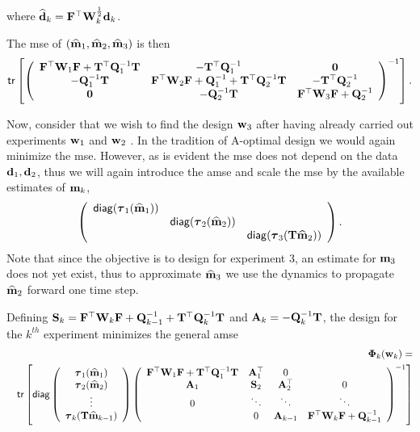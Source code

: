 \documentclass[11pt]{article}
\newcommand{\bfA}	{{\bf{A}}}
\newcommand{\bfF}	{{\bf{F}}}
\newcommand{\bfQ}	{{\bf{Q}}}
\newcommand{\bfS}	{{\bf{S}}}
\newcommand{\bfT}	{{\bf{T}}}
\newcommand{\bfW}	{{\bf{W}}}
\newcommand{\bfd}	{{\bf{d}}}
\newcommand{\bfm}	{{\bf{m}}}
\newcommand{\bfw}	{{\bf{w}}}
\newcommand{\hf}        {{\frac 12}}
\newcommand{\bfPhi}     {{\boldsymbol \Phi}}
\newcommand{\bftau}      {{\boldsymbol \tau}}
\newcommand {\zero}  { {\bf 0} }
\renewcommand{\hf}		 {\frac12}
\newcommand{\bfmhat}    {{\widehat{\bfm}}}
\newcommand{\bfdhat}    {{\widehat{\bfd}}}
\begin{document}
where $\bfdhat_k = \bfF^{\top}\bfW_k^{\hf}\bfd_k$. 

The {\sf mse} of $(\bfmhat_1,\bfmhat_2, \bfmhat_3)$ is then
\begin{equation*}
 {\sf tr}\left[\left(\begin{array}{ccc}\bfF^{\top}\bfW_1\bfF + \bfT^{\top}\bfQ^{-1}_1\bfT   & -\bfT^{\top}\bfQ^{-1}_1 & \zero\\
 -\bfQ^{-1}_1\bfT & \bfF^{\top}\bfW_2\bfF + \bfQ^{-1}_1 + \bfT^{\top}\bfQ^{-1}_2\bfT  & -\bfT^{\top}\bfQ^{-1}_2\\
 \zero & -\bfQ^{-1}_2\bfT & \bfF^{\top}\bfW_3\bfF + \bfQ^{-1}_2  
 \end{array}\right)^{-1}	\right]	.
\end{equation*}

 Now, consider that we wish to find the design $\bfw_3$ after having already carried out experiments $\bfw_1$ and  $\bfw_2$ . In the tradition of A-optimal design we would again minimize the {\sf mse}. However, as is evident  the {\sf mse} does not depend on the data $\bfd_1, \bfd_2$, thus we will again introduce the {\sf amse} and scale the {\sf mse} by the available estimates of $\bfm_{k}$, 
\begin{equation*}
 \left( \begin{array}{ccc}{\sf diag}(\bftau_1(\bfmhat_1))& & \\
  & {\sf diag}(\bftau_2(\bfmhat_2))& 
  \\& & {\sf diag}(\bftau_3(\bfT\bfmhat_2))
  \end{array}\right).
\end{equation*}
Note that since the objective is to design for experiment 3, an estimate for $\bfm_3$ does not yet exist, thus to approximate $\bfmhat_3$ we use the dynamics to propagate $\bfmhat_2$ forward one time step.

Defining $\bfS_k = \bfF^{\top}\bfW_{k}\bfF + \bfQ^{-1}_{k-1} + \bfT^{\top}\bfQ^{-1}_{k}\bfT$  and $\bfA_k = -\bfQ^{-1}_k \bfT$, the design for the $k^{th}$ experiment minimizes  the  general {\sf amse} 
\begin{eqnarray}
\label{eq:noisyPhi}
&&\bfPhi_k(\bfw_k) =\\ 
\nonumber
&&{\sf tr} \left[{\sf diag}\left( \begin{array}{c}
\bftau_1(\bfmhat_1) \\ 
\bftau_2(\bfmhat_2)  \\
\vdots \\
\bftau_k(\bfT\bfmhat_{k-1})\end{array}\right)
\left(\begin{array}{cccc}
  \bfF^{\top}\bfW_{1}\bfF  + \bfT^{\top}\bfQ^{-1}_{1}\bfT  &  \bfA^{\top}_1 & 0 & \\
 \bfA_1 & \bfS_2 & \bfA^{\top}_2 & 0 \\
 0 & \ddots & \ddots & \ddots \\
 & 0 & \bfA_{k-1} &  \bfF^{\top}\bfW_{k}\bfF + \bfQ^{-1}_{k-1} 
  \end{array}\right)^{-1}\right]
\end{eqnarray}
  
\end{document}
